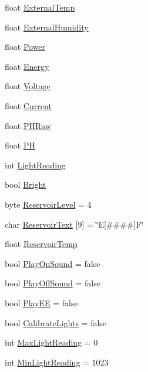 \begin{DoxyCompactItemize}
\item 
float \mbox{\hyperlink{_gbox420_8ino_a79353cbe0baa35962ef08bd20492e04e}{External\+Temp}}
\item 
float \mbox{\hyperlink{_gbox420_8ino_afb319b71bf9d792b8932b66cde733d26}{External\+Humidity}}
\item 
float \mbox{\hyperlink{_gbox420_8ino_aeca176f09c48cbe15df7fc4fff7c77f7}{Power}}
\item 
float \mbox{\hyperlink{_gbox420_8ino_adc6a4c6cf1b30c287e112a04fb388a8b}{Energy}}
\item 
float \mbox{\hyperlink{_gbox420_8ino_a3ed583f6febf5e0b8e9d3dc196a87085}{Voltage}}
\item 
float \mbox{\hyperlink{_gbox420_8ino_ae8d3473f04d1b074e042108e0816efe6}{Current}}
\item 
float \mbox{\hyperlink{_gbox420_8ino_a64ad68ad7bbd752a773aea65489e14c3}{P\+H\+Raw}}
\item 
float \mbox{\hyperlink{_gbox420_8ino_a24c17fffcda727c63b14ab48a1b63144}{PH}}
\item 
int \mbox{\hyperlink{_gbox420_8ino_a396c3cc50997eb87bc2cd2de11777f91}{Light\+Reading}}
\item 
bool \mbox{\hyperlink{_gbox420_8ino_a89d4fd51ad48b93c7d64c446a50168f7}{Bright}}
\item 
byte \mbox{\hyperlink{_gbox420_8ino_abd2779621ef8e36425e65dd34b847d31}{Reservoir\+Level}} = 4
\item 
char \mbox{\hyperlink{_gbox420_8ino_ad27e9c33dfa6d9cec818bb25429eecdc}{Reservoir\+Text}} \mbox{[}9\mbox{]} = \char`\"{}E\mbox{[}\#\#\#\#\mbox{]}F\char`\"{}
\item 
float \mbox{\hyperlink{_gbox420_8ino_af9f16fa027fe7f66825c7ad76b4ffac6}{Reservoir\+Temp}}
\item 
bool \mbox{\hyperlink{_gbox420_8ino_a035f4303ac9dfecdaf4e3d6cc5781df3}{Play\+On\+Sound}} = false
\item 
bool \mbox{\hyperlink{_gbox420_8ino_a57c15c5b42a23fed577bf887ae8ca61b}{Play\+Off\+Sound}} = false
\item 
bool \mbox{\hyperlink{_gbox420_8ino_aba29a142c3dcc9302d08d08d46eed8d1}{Play\+EE}} = false
\item 
bool \mbox{\hyperlink{_gbox420_8ino_a5bfd35472ec119a55c575020da9eed65}{Calibrate\+Lights}} = false
\item 
int \mbox{\hyperlink{_gbox420_8ino_ab2dbf4d376ea2f1ca361ceac772656c2}{Max\+Light\+Reading}} = 0
\item 
int \mbox{\hyperlink{_gbox420_8ino_ac9093761e17ca6ebc97951a68d93b06b}{Min\+Light\+Reading}} = 1023

\end{DoxyCompactItemize}

